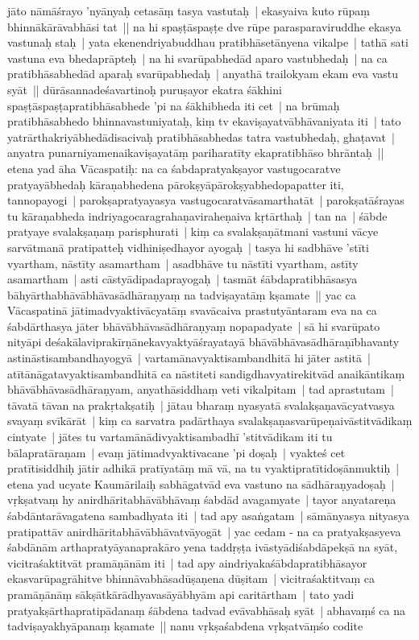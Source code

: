 \documentclass[article,12pt,a4paper]{memoir}%
\newcounter{parCount}
\begin{document}
	  \pstart \leavevmode%
	jāto nāmāśrayo 'nyānyaḥ cetasāṃ tasya vastutaḥ | ekasyaiva kuto rūpaṃ bhinnākārāvabhāsi tat ||  \label{thakur75-60.29} na hi spaṣṭāspaṣṭe dve rūpe parasparaviruddhe ekasya vastunaḥ staḥ | yata ekenendriyabuddhau pratibhāsetānyena vikalpe | tathā sati vastuna eva bhedaprāpteḥ | na hi svarūpabhedād aparo vastubhedaḥ | na ca pratibhāsabhedād aparaḥ svarūpabhedaḥ | anyathā trailokyam ekam eva vastu syāt || \label{thakur75-61.3} dūrāsannadeśavartinoḥ puruṣayor ekatra śākhini spaṣṭāspaṣṭapratibhāsabhede 'pi na śākhibheda iti cet | na brūmaḥ pratibhāsabhedo bhinnavastuniyataḥ, kiṃ tv ekaviṣayatvābhāvaniyata iti | tato yatrārthakriyābhedādisacivaḥ pratibhāsabhedas tatra vastubhedaḥ, ghaṭavat | anyatra punarniyamenaikaviṣayatāṃ pariharatīty ekapratibhāso bhrāntaḥ || \label{thakur75-61.7} etena yad āha Vācaspatiḥ: na ca śabdapratyakṣayor vastugocaratve pratyayābhedaḥ kāraṇabhedena pārokṣyāpārokṣyabhedopapatter iti, tannopayogi | parokṣapratyayasya vastugocaratvāsamarthatāt | parokṣatāśrayas tu kāraṇabheda indriyagocaragrahaṇaviraheṇaiva kṛtārthaḥ | tan na | śābde pratyaye svalakṣaṇaṃ parisphurati | kiṃ ca svalakṣaṇātmani vastuni vācye sarvātmanā pratipatteḥ vidhiniṣedhayor ayogaḥ | tasya hi sadbhāve 'stīti vyartham, nāstīty asamartham | asadbhāve tu nāstīti vyartham, astīty asamartham | asti cāstyādipadaprayogaḥ | tasmāt śābdapratibhāsasya bāhyārthabhāvābhāvasādhāraṇyaṃ na tadviṣayatāṃ kṣamate || \label{thakur75-61.15} yac ca Vācaspatinā jātimadvyaktivācyatāṃ svavācaiva prastutyāntaram eva na ca śabdārthasya jāter bhāvābhāvasādhāraṇyaṃ nopapadyate | sā hi svarūpato nityāpi deśakālaviprakīrṇānekavyaktyāśrayatayā bhāvābhāvasādhāraṇībhavanty astināstisambandhayogyā | vartamānavyaktisambandhitā hi jāter astitā | atītānāgatavyaktisambandhitā ca nāstiteti sandigdhavyatirekitvād anaikāntikaṃ bhāvābhāvasādhāraṇyam, anyathāsiddhaṃ veti vikalpitam | tad aprastutam | tāvatā tāvan na prakṛtakṣatiḥ | jātau bharaṃ nyasyatā svalakṣaṇavācyatvasya svayaṃ svīkārāt | kiṃ ca sarvatra padārthaya svalakṣaṇasvarūpeṇaivāstitvādikaṃ cintyate | jātes tu vartamānādivyaktisambadhī 'stitvādikam iti tu bālapratāraṇam | evaṃ jātimadvyaktivacane 'pi doṣaḥ | vyakteś cet pratītisiddhiḥ jātir adhikā pratīyatāṃ mā vā, na tu vyaktipratītidoṣānmuktiḥ | \label{thakur75-61.25} etena yad ucyate Kaumārilaiḥ sabhāgatvād eva vastuno na sādhāraṇyadoṣaḥ | vṛkṣatvaṃ hy anirdhāritabhāvābhāvaṃ śabdād avagamyate | tayor anyatareṇa śabdāntarāvagatena sambadhyata iti | tad apy asaṅgatam | sāmānyasya nityasya pratipattāv anirdhāritabhāvābhāvatvāyogāt | \label{thakur75-62.1} yac cedam - na ca pratyakṣasyeva śabdānām arthapratyāyanaprakāro yena taddṛṣṭa ivāstyādiśabdāpekṣā na syāt, vicitraśaktitvāt pramāṇānām iti | tad apy aindriyakaśābdapratibhāsayor ekasvarūpagrāhitve bhinnāvabhāsadūṣaṇena dūṣitam | vicitraśaktitvaṃ ca pramāṇānāṃ sākṣātkārādhyavasāyābhyām api caritārtham | tato yadi pratyakṣārthapratipādanaṃ śābdena tadvad evāvabhāsaḥ syāt | abhavaṃś ca na tadviṣayakhyāpanaṃ kṣamate || \label{thakur75-62.6} nanu vṛkṣaśabdena vṛkṣatvāṃśo codite 
\end{document}
